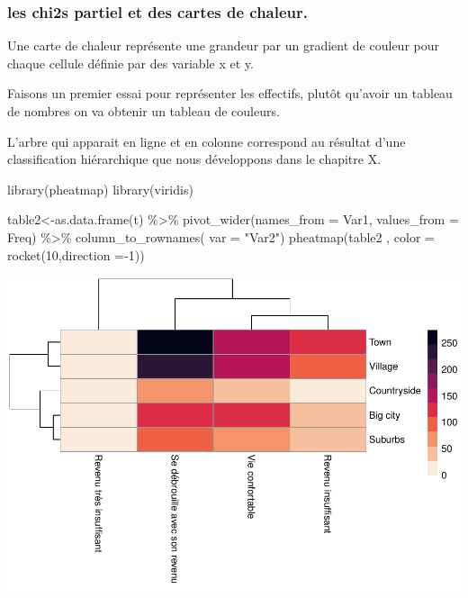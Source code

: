 \documentclass[
]{book}
\newenvironment{Shaded}{\begin{snugshade}}{\end{snugshade}}
\newcommand{\AttributeTok}[1]{\textcolor[rgb]{0.77,0.63,0.00}{#1}}
\newcommand{\DecValTok}[1]{\textcolor[rgb]{0.00,0.00,0.81}{#1}}
\newcommand{\FunctionTok}[1]{\textcolor[rgb]{0.00,0.00,0.00}{#1}}
\newcommand{\NormalTok}[1]{#1}
\newcommand{\OtherTok}[1]{\textcolor[rgb]{0.56,0.35,0.01}{#1}}
\newcommand{\SpecialCharTok}[1]{\textcolor[rgb]{0.00,0.00,0.00}{#1}}
\newcommand{\StringTok}[1]{\textcolor[rgb]{0.31,0.60,0.02}{#1}}
\begin{document}
\hypertarget{les-chi2s-partiel-et-des-cartes-de-chaleur.}{%
\subsubsection{les chi2s partiel et des cartes de chaleur.}\label{les-chi2s-partiel-et-des-cartes-de-chaleur.}}

Une carte de chaleur représente une grandeur par un gradient de couleur pour chaque cellule définie par des variable x et y.

Faisons un premier essai pour représenter les effectifs, plutôt qu'avoir un tableau de nombres on va obtenir un tableau de couleurs.

L'arbre qui apparait en ligne et en colonne correspond au résultat d'une classification hiérarchique que nous développons dans le chapitre X.

\begin{Shaded}
\begin{Highlighting}[]
\FunctionTok{library}\NormalTok{(pheatmap)}
\FunctionTok{library}\NormalTok{(viridis)}

\NormalTok{table2}\OtherTok{\textless{}{-}}\FunctionTok{as.data.frame}\NormalTok{(t) }\SpecialCharTok{\%\textgreater{}\%}
  \FunctionTok{pivot\_wider}\NormalTok{(}\AttributeTok{names\_from =}\NormalTok{ Var1, }\AttributeTok{values\_from =}\NormalTok{ Freq) }\SpecialCharTok{\%\textgreater{}\%}
  \FunctionTok{column\_to\_rownames}\NormalTok{( }\AttributeTok{var =} \StringTok{"Var2"}\NormalTok{)}
\FunctionTok{pheatmap}\NormalTok{(table2 , }\AttributeTok{color =} \FunctionTok{rocket}\NormalTok{(}\DecValTok{10}\NormalTok{,}\AttributeTok{direction =}\SpecialCharTok{{-}}\DecValTok{1}\NormalTok{))}
\end{Highlighting}
\end{Shaded}

\includegraphics{bookdown-demo_files/figure-latex/0429-1.pdf}
\end{document}
